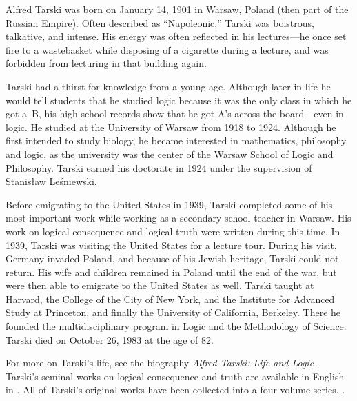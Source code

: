 \documentclass[../../../include/open-logic-section]{subfiles}
\begin{document}



Alfred Tarski was born on January 14, 1901 in Warsaw, Poland (then
part of the Russian Empire). Often described as ``Napoleonic,'' Tarski
was boistrous, talkative, and intense.  His energy was often reflected
in his lectures---he once set fire to a wastebasket while disposing of
a cigarette during a lecture, and was forbidden from lecturing in that
building again.

Tarski had a thirst for knowledge from a young age. Although later in
life he would tell students that he studied logic because it was the
only class in which he got a~B, his high school records show that he
got A's across the board---even in logic. He studied at the University
of Warsaw from 1918 to 1924. Although he first intended to study
biology, he became interested in mathematics, philosophy, and logic,
as the university was the center of the Warsaw School of Logic and
Philosophy. Tarski earned his doctorate in 1924 under the supervision of
Stanis\l{}aw Le\'{s}niewski.

Before emigrating to the United States in 1939, Tarski completed some
of his most important work while working as a secondary school teacher
in Warsaw. His work on logical consequence and logical truth were
written during this time. In 1939, Tarski was visiting the United
States for a lecture tour. During his visit, Germany invaded Poland,
and because of his Jewish heritage, Tarski could not return.  His wife
and children remained in Poland until the end of the war, but were
then able to emigrate to the United States as well.  Tarski taught at
Harvard, the College of the City of New York, and the Institute for
Advanced Study at Princeton, and finally the University of California,
Berkeley. There he founded the multidisciplinary program in Logic and
the Methodology of Science.  Tarski died on October 26, 1983 at the
age of 82.

\begin{reading} 
For more on Tarski's life, see the biography \emph{Alfred Tarski: Life
  and Logic} \citep{Feferman2004}. Tarski's seminal works on logical
consequence and truth are available in English in \citet{Tarski1983}.
All of Tarski's original works have been collected into a four volume
series, \citet{Tarski1981}.
\end{reading}
\end{document}
